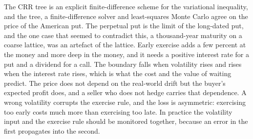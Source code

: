 The CRR tree is an explicit finite-difference scheme for the variational inequality, and the tree, a finite-difference solver and least-squares Monte Carlo agree on the price of the American put.
The perpetual put is the limit of the long-dated put, and the one case that seemed to contradict this, a thousand-year maturity on a coarse lattice, was an artefact of the lattice.
Early exercise adds a few percent at the money and more deep in the money, and it needs a positive interest rate for a put and a dividend for a call.
The boundary falls when volatility rises and rises when the interest rate rises, which is what the cost and the value of waiting predict.
The price does not depend on the real-world drift but the buyer's expected profit does, and a seller who does not hedge carries that dependence.
A wrong volatility corrupts the exercise rule, and the loss is asymmetric: exercising too early costs much more than exercising too late.
In practice the volatility input and the exercise rule should be monitored together, because an error in the first propagates into the second.
